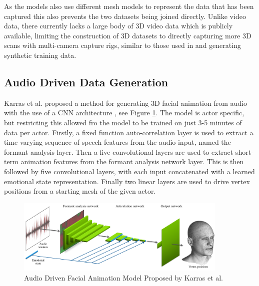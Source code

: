 As the models also use different mesh models to represent the data that has been captured this also prevents the two datasets being joined directly.
Unlike video data, there currently lacks a large body of 3D video data which is publicly available, limiting the construction of 3D datasets to directly capturing more 3D scans with multi-camera capture rigs, similar to those used in \cite{Tzirakis2019, Cudeiro2019} and generating synthetic training data.

\subsection{Audio Driven Data Generation}
Karras et al. proposed a method for generating 3D facial animation from audio with the use of a CNN architecture \cite{Karras2017a}, see Figure \ref{fig:Karras_Model}.
The model is actor specific, but restricting this allowed fro the model to be trained on just 3-5 minutes of data per actor.
Firstly, a fixed function auto-correlation layer is used to extract a time-varying sequence of speech features from the audio input, named the formant analysis layer.
Then a five convolutional layers are used to extract short-term animation features from the formant analysis network layer.
This is then followed by five convolutional layers, with each input concatenated with a learned emotional state representation.
Finally two linear layers are used to drive vertex positions from a starting mesh of the given actor.

\begin{figure}[h]
    \centering
        \includegraphics[width=0.9\textwidth]{figures/karras_model.png}
    \caption{Audio Driven Facial Animation Model Proposed by Karras et al. \cite{Karras2017a}}\label{fig:Karras_Model}
\end{figure}


